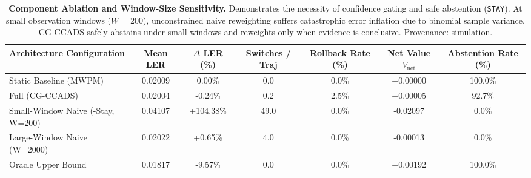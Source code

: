 \begin{table}[t]
\centering
\small
\caption{\textbf{Component Ablation and Window-Size Sensitivity.} Demonstrates the necessity of confidence gating and safe abstention (\texttt{STAY}). At small observation windows ($W=200$), unconstrained naive reweighting suffers catastrophic error inflation due to binomial sample variance. CG-CCADS safely abstains under small windows and reweights only when evidence is conclusive. Provenance: simulation.}
\label{tab:ablation}
\begin{tabular}{lcccccc}
\toprule
\textbf{Architecture Configuration} & \textbf{Mean LER} & \textbf{$\Delta$ LER (\%)} & \textbf{Switches / Traj} & \textbf{Rollback Rate (\%)} & \textbf{Net Value $V_{\text{net}}$} & \textbf{Abstention Rate (\%)} \\
\midrule
Static Baseline (MWPM) & 0.02009 & 0.00\% & 0.0 & 0.0\% & +0.00000 & 100.0\% \\
Full (CG-CCADS) & 0.02004 & -0.24\% & 0.2 & 2.5\% & +0.00005 & 92.7\% \\
Small-Window Naive (-Stay, W=200) & 0.04107 & +104.38\% & 49.0 & 0.0\% & -0.02097 & 0.0\% \\
Large-Window Naive (W=2000) & 0.02022 & +0.65\% & 4.0 & 0.0\% & -0.00013 & 0.0\% \\
Oracle Upper Bound & 0.01817 & -9.57\% & 0.0 & 0.0\% & +0.00192 & 100.0\% \\
\bottomrule
\end{tabular}
\end{table}
